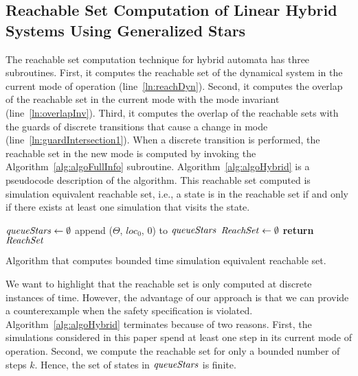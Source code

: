 \subsection{Reachable Set Computation of Linear Hybrid Systems Using Generalized Stars}
%
The reachable set computation technique for hybrid automata has three subroutines.
%
First, it computes the reachable set of the dynamical system in the current mode of operation (line~\ref{ln:reachDyn}).
%
Second, it computes the overlap of the reachable set in the current mode with the mode invariant (line~\ref{ln:overlapInv}).
%
Third, it computes the overlap of the reachable sets with the guards of discrete transitions that cause a change in mode (line~\ref{ln:guardIntersection1}).
%
When a discrete transition is performed, the reachable set in the new mode is computed by invoking the Algorithm~\ref{alg:algoFullInfo} subroutine.
%
Algorithm~\ref{alg:algoHybrid} is a pseudocode description of the algorithm. This reachable set computed is simulation equivalent reachable set, i.e., a state is in the reachable set if and only if there exists at least one simulation that visits the state.

\begin{algorithm}[h!]
\SetAlgoVlined
{}
${\it queueStars} \gets \emptyset$\; 
append ($\Theta$, $loc_0$, $0$) to ${\it queueStars}$\; 
${\it ReachSet} \gets \emptyset$\;
{\bf return} ${\it ReachSet}$\;
\caption{Algorithm that computes bounded time simulation equivalent reachable set.}
\label{alg:algoHybrid}
\end{algorithm}

We want to highlight that the reachable set is only computed at discrete instances of time.
%
However, the advantage of our approach is that we can provide a counterexample when the safety specification is violated.
%
Algorithm~\ref{alg:algoHybrid} terminates because of two reasons. First, the simulations considered in this paper spend at least one step in its current mode of operation. Second, we compute the reachable set for only a bounded number of steps $k$. Hence, the set of states in ${\it queueStars}$ is finite.

